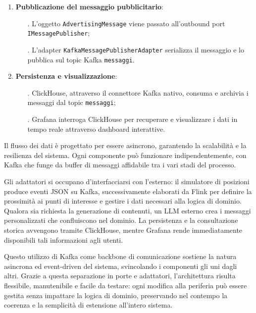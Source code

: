 \documentclass[10pt]{article}
\begin{document}
\begin{enumerate}
        \item \textbf{Pubblicazione del messaggio pubblicitario}:
        \begin{itemize}
            \item[.] L'oggetto \texttt{AdvertisingMessage} viene passato all'outbound port \texttt{IMessagePublisher};
            \item[.] L'adapter \texttt{KafkaMessagePublisherAdapter} serializza il messaggio e lo pubblica sul topic Kafka \texttt{messaggi}.
        \end{itemize}
        
        \item \textbf{Persistenza e visualizzazione}:
        \begin{itemize}
            \item[.] ClickHouse, attraverso il connettore Kafka nativo, consuma e archivia i messaggi dal topic \texttt{messaggi};
            \item[.] Grafana interroga ClickHouse per recuperare e visualizzare i dati in tempo reale attraverso dashboard interattive.
        \end{itemize}
    \end{enumerate}
    
    Il flusso dei dati è progettato per essere asincrono, garantendo la scalabilità e la resilienza del sistema. Ogni componente può funzionare indipendentemente, con Kafka che funge da buffer di messaggi affidabile tra i vari stadi del processo.

    Gli adattatori si occupano d'interfacciarsi con l'esterno: il simulatore di posizioni produce eventi JSON su Kafka, successivamente elaborati da Flink per definire la prossimità ai punti di interesse e gestire i dati necessari alla logica di dominio. Qualora sia richiesta la generazione di contenuti, un LLM esterno crea i messaggi personalizzati che confluiscono nel dominio. La persistenza e la consultazione storica avvengono tramite ClickHouse, mentre Grafana rende immediatamente disponibili tali informazioni agli utenti.

    Questo utilizzo di Kafka come backbone di comunicazione sostiene la natura asincrona ed event-driven del sistema, svincolando i componenti gli uni dagli altri. Grazie a questa separazione in porte e adattatori, l'architettura risulta flessibile, manutenibile e facile da testare: ogni modifica alla periferia può essere gestita senza impattare la logica di dominio, preservando nel contempo la coerenza e la semplicità di estensione all'intero sistema.
\end{document}
